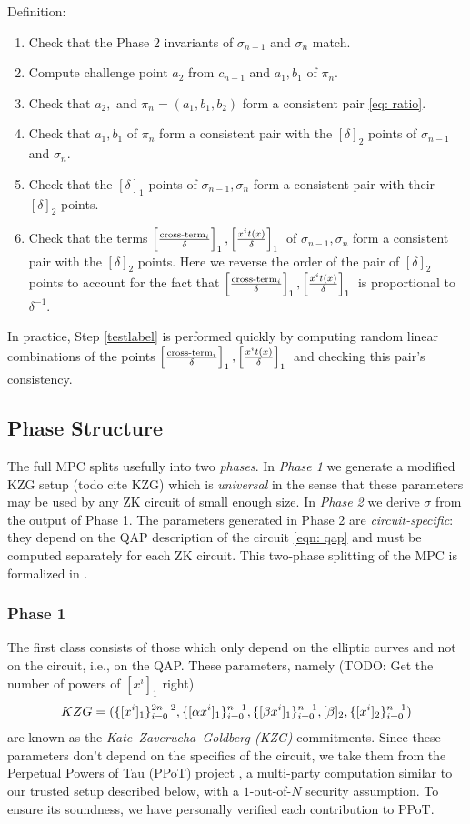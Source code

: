 Definition:
\begin{enumerate}
    \item Check that the Phase 2 invariants of $\sigma_{n-1}$ and $\sigma_n$ match.
    \item Compute challenge point $a_2$ from $c_{n-1}$ and $a_1, b_1$ of $\pi_n$.
    \item Check that $a_2,$ and $\pi_n = (a_1, b_1, b_2)$ form a consistent pair \eqref{eq: ratio}.
    \item Check that $a_1, b_1$ of $\pi_n$ form a consistent pair with the $[\delta]_2$ points of $\sigma_{n-1}$ and $\sigma_n$. 
    \item Check that the $[\delta]_1$ points of $\sigma_{n-1}, \sigma_n$ form a consistent pair with their $[\delta]_2$ points.
    \item\label{testlabel} Check that the terms $\left[\frac{\text{cross-term}_i }{\delta}\right]_1, \left[ \frac{x^i t(x)}{\delta} \right]_1{}$ of $\sigma_{n-1}, \sigma_n$ form a consistent pair with the $[\delta]_2$ points. Here we reverse the order of the pair of $[\delta]_2$ points to account for the fact that $\left[\frac{\text{cross-term}_i }{\delta}\right]_1, \left[ \frac{x^i t(x)}{\delta} \right]_1{}$ is proportional to $\delta^{-1}$.
\end{enumerate}
In practice, Step \ref{testlabel} is performed quickly by computing random linear combinations of the points $\left[\frac{\text{cross-term}_i }{\delta}\right]_1, \left[ \frac{x^i t(x)}{\delta} \right]_1{}$ and checking this pair's consistency.

\subsection{Phase Structure}

The full \Setup{} MPC splits usefully into two \emph{phases}. In \emph{Phase 1} we generate a modified KZG setup (todo cite KZG) which is \emph{universal} in the sense that these parameters may be used by any ZK circuit of small enough size. In \emph{Phase 2} we derive $\sigma$ from the output of Phase 1. The parameters generated in Phase 2 are \emph{circuit-specific}: they depend on the QAP description of the circuit \eqref{eqn: qap} and must be computed separately for each ZK circuit. This two-phase splitting of the MPC is formalized in \cite{bowe19}.

\subsubsection{Phase 1}

The first class consists of those which only depend on the elliptic curves and not on the circuit, i.e., on the QAP. These parameters, namely (TODO: Get the number of powers of $[x^i]_1$ right)
\begin{align}\label{eq: kzg}
KZG = ( \{ [x^i]_1 \}_{i=0}^{2n-2}, \{ [\alpha x^i]_1 \}_{i=0}^{n-1}, \{ [\beta x^i]_1 \}_{i=0}^{n-1}, [\beta]_2, \{ [x^i]_2 \}_{i=0}^{n-1} ){}
\end{align}
are known as the \emph{Kate--Zaverucha--Goldberg (KZG)} commitments. Since these parameters don't depend on the specifics of the circuit, we take them from the Perpetual Powers of Tau (PPoT) project \cite{PPoT}, a multi-party computation similar to our trusted setup described below, with a $1$-out-of-$N$ security assumption. To ensure its soundness, we have personally verified each contribution to PPoT.


